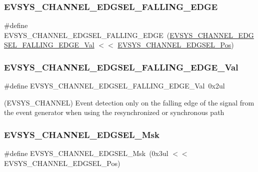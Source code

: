 \subsubsection{\texorpdfstring{EVSYS\_CHANNEL\_EDGSEL\_FALLING\_EDGE}{EVSYS\_CHANNEL\_EDGSEL\_FALLING\_EDGE}}
{\footnotesize\ttfamily \#define E\+V\+S\+Y\+S\+\_\+\+C\+H\+A\+N\+N\+E\+L\+\_\+\+E\+D\+G\+S\+E\+L\+\_\+\+F\+A\+L\+L\+I\+N\+G\+\_\+\+E\+D\+GE~(\mbox{\hyperlink{group___s_a_m_d21___e_v_s_y_s_gaea62b90832a5f319570b4fd0cdb884d5}{E\+V\+S\+Y\+S\+\_\+\+C\+H\+A\+N\+N\+E\+L\+\_\+\+E\+D\+G\+S\+E\+L\+\_\+\+F\+A\+L\+L\+I\+N\+G\+\_\+\+E\+D\+G\+E\+\_\+\+Val}} $<$$<$ \mbox{\hyperlink{group___s_a_m_d21___e_v_s_y_s_ga940ccedfddf915a4532da9b752cab3a0}{E\+V\+S\+Y\+S\+\_\+\+C\+H\+A\+N\+N\+E\+L\+\_\+\+E\+D\+G\+S\+E\+L\+\_\+\+Pos}})}

\mbox{\label{group___s_a_m_d21___e_v_s_y_s_gaea62b90832a5f319570b4fd0cdb884d5}} 
\subsubsection{\texorpdfstring{EVSYS\_CHANNEL\_EDGSEL\_FALLING\_EDGE\_Val}{EVSYS\_CHANNEL\_EDGSEL\_FALLING\_EDGE\_Val}}
{\footnotesize\ttfamily \#define E\+V\+S\+Y\+S\+\_\+\+C\+H\+A\+N\+N\+E\+L\+\_\+\+E\+D\+G\+S\+E\+L\+\_\+\+F\+A\+L\+L\+I\+N\+G\+\_\+\+E\+D\+G\+E\+\_\+\+Val~0x2ul}



(E\+V\+S\+Y\+S\+\_\+\+C\+H\+A\+N\+N\+EL) Event detection only on the falling edge of the signal from the event generator when using the resynchronized or synchronous path 

\mbox{\label{group___s_a_m_d21___e_v_s_y_s_gaf603adba0ca49498f9d62deee0243386}} 
\subsubsection{\texorpdfstring{EVSYS\_CHANNEL\_EDGSEL\_Msk}{EVSYS\_CHANNEL\_EDGSEL\_Msk}}
{\footnotesize\ttfamily \#define E\+V\+S\+Y\+S\+\_\+\+C\+H\+A\+N\+N\+E\+L\+\_\+\+E\+D\+G\+S\+E\+L\+\_\+\+Msk~(0x3ul $<$$<$ E\+V\+S\+Y\+S\+\_\+\+C\+H\+A\+N\+N\+E\+L\+\_\+\+E\+D\+G\+S\+E\+L\+\_\+\+Pos)}

